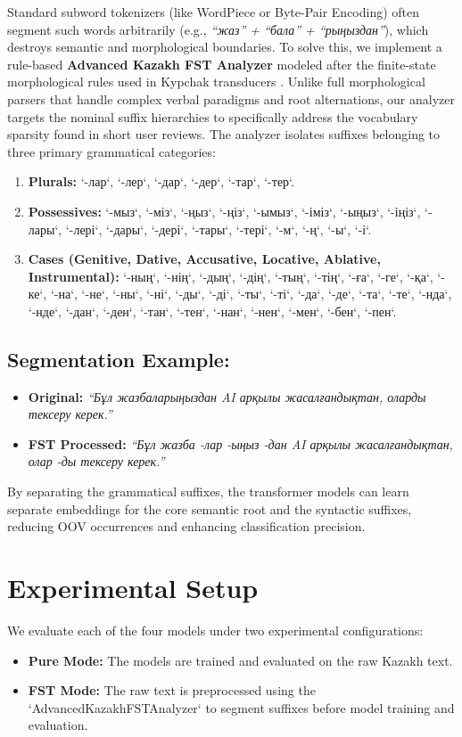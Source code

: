\documentclass[runningheads]{llncs}
\begin{document}
Standard subword tokenizers (like WordPiece or Byte-Pair Encoding) often segment such words arbitrarily (e.g., \textit{``жаз'' + ``бала'' + ``рыңыздан''}), which destroys semantic and morphological boundaries. To solve this, we implement a rule-based \textbf{Advanced Kazakh FST Analyzer} modeled after the finite-state morphological rules used in Kypchak transducers \cite{6}. Unlike full morphological parsers that handle complex verbal paradigms and root alternations, our analyzer targets the nominal suffix hierarchies to specifically address the vocabulary sparsity found in short user reviews.
The analyzer isolates suffixes belonging to three primary grammatical categories:
\begin{enumerate}
\item \textbf{Plurals:} `-лар`, `-лер`, `-дар`, `-дер`, `-тар`, `-тер`.
\item \textbf{Possessives:} `-мыз`, `-міз`, `-ңыз`, `-ңіз`, `-ымыз`, `-іміз`, `-ыңыз`, `-іңіз`, `-лары`, `-лері`, `-дары`, `-дері`, `-тары`, `-тері`, `-м`, `-ң`, `-ы`, `-і`.
\item \textbf{Cases (Genitive, Dative, Accusative, Locative, Ablative, Instrumental):} `-ның`, `-нің`, `-дың`, `-дің`, `-тың`, `-тің`, `-ға`, `-ге`, `-қа`, `-ке`, `-на`, `-не`, `-ны`, `-ні`, `-ды`, `-ді`, `-ты`, `-ті`, `-да`, `-де`, `-та`, `-те`, `-нда`, `-нде`, `-дан`, `-ден`, `-тан`, `-тен`, `-нан`, `-нен`, `-мен`, `-бен`, `-пен`.
\end{enumerate}

\subsection{Segmentation Example:}
\begin{itemize}
\item \textbf{Original:} \textit{``Бұл жазбаларыңыздан AI арқылы жасалғандықтан, оларды тексеру керек.''}
\item \textbf{FST Processed:} \textit{``Бұл жазба -лар -ыңыз -дан AI арқылы жасалғандықтан, олар -ды тексеру керек.''}
\end{itemize}

By separating the grammatical suffixes, the transformer models can learn separate embeddings for the core semantic root and the syntactic suffixes, reducing OOV occurrences and enhancing classification precision.
\section{Experimental Setup}
We evaluate each of the four models under two experimental configurations:
\begin{itemize}
\item \textbf{Pure Mode:} The models are trained and evaluated on the raw Kazakh text.
\item \textbf{FST Mode:} The raw text is preprocessed using the `AdvancedKazakhFSTAnalyzer` to segment suffixes before model training and evaluation.
\end{itemize}
\end{document}
